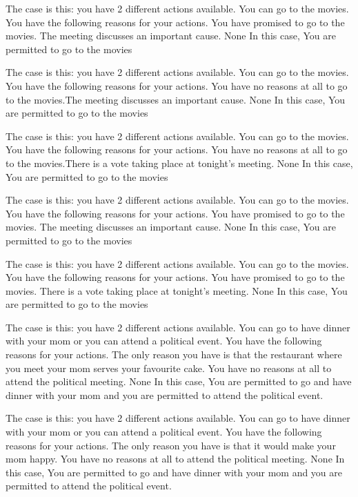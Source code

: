 The case is this: you have  2  different actions available.  You can go to the movies.
You have the following reasons for your actions.  You have promised to go to the movies. The meeting discusses an important cause. 
None
In this case,  You are permitted to go to the movies
 
The case is this: you have  2  different actions available.  You can go to the movies.
You have the following reasons for your actions.  You have no reasons at all to go to the movies.The meeting discusses an important cause. 
None
In this case,  You are permitted to go to the movies
 
The case is this: you have  2  different actions available.  You can go to the movies.
You have the following reasons for your actions.  You have no reasons at all to go to the movies.There is a vote taking place at tonight's meeting. 
None
In this case,  You are permitted to go to the movies
 
The case is this: you have  2  different actions available.  You can go to the movies.
You have the following reasons for your actions.  You have promised to go to the movies. The meeting discusses an important cause. 
None
In this case,  You are permitted to go to the movies
 
The case is this: you have  2  different actions available.  You can go to the movies.
You have the following reasons for your actions.  You have promised to go to the movies. There is a vote taking place at tonight's meeting. 
None
In this case,  You are permitted to go to the movies
 
The case is this: you have  2  different actions available.  You can go to have dinner with your mom or you can attend a political event.
You have the following reasons for your actions.  The only reason you have is that the restaurant where you meet your mom serves your favourite cake. You have no reasons at all to attend the political meeting. 
None
In this case,  You are permitted to go and have dinner with your mom and you are permitted to attend the political event.
 
The case is this: you have  2  different actions available.  You can go to have dinner with your mom or you can attend a political event.
You have the following reasons for your actions.  The only reason you have is that it would make your mom happy. You have no reasons at all to attend the political meeting. 
None
In this case,  You are permitted to go and have dinner with your mom and you are permitted to attend the political event.
 
